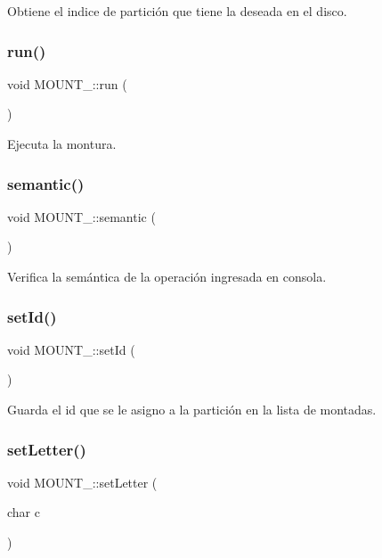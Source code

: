 Obtiene el indice de partición que tiene la deseada en el disco. \mbox{\label{classMOUNT___a4ed2206e1edd2eec7804514ebdbb8ee3}} 
\subsubsection{\texorpdfstring{run()}{run()}}
{\footnotesize\ttfamily void M\+O\+U\+N\+T\+\_\+\+::run (\begin{DoxyParamCaption}{ }\end{DoxyParamCaption})}

Ejecuta la montura. \mbox{\label{classMOUNT___ae0df247d4a3d27886c941352607d7bc2}} 
\subsubsection{\texorpdfstring{semantic()}{semantic()}}
{\footnotesize\ttfamily void M\+O\+U\+N\+T\+\_\+\+::semantic (\begin{DoxyParamCaption}{ }\end{DoxyParamCaption})}

Verifica la semántica de la operación ingresada en consola. \mbox{\label{classMOUNT___a938fb0ea2d4dacaf795ceed3dba82552}} 
\subsubsection{\texorpdfstring{set\+Id()}{setId()}}
{\footnotesize\ttfamily void M\+O\+U\+N\+T\+\_\+\+::set\+Id (\begin{DoxyParamCaption}{ }\end{DoxyParamCaption})}

Guarda el id que se le asigno a la partición en la lista de montadas. \mbox{\label{classMOUNT___a0c2649414eda3ba4132e847e9903830c}} 
\subsubsection{\texorpdfstring{set\+Letter()}{setLetter()}}
{\footnotesize\ttfamily void M\+O\+U\+N\+T\+\_\+\+::set\+Letter (\begin{DoxyParamCaption}\item[{char}]{c }\end{DoxyParamCaption})}

